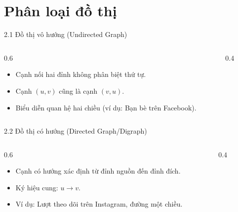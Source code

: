 \documentclass[aspectratio=169]{beamer}
\begin{document}
\section{Phân loại đồ thị}
\begin{frame}{2.1 Đồ thị vô hướng (Undirected Graph)}
    \begin{columns}
        \begin{column}{0.6\textwidth}
            \begin{itemize}
                \item Cạnh nối hai đỉnh không phân biệt thứ tự.
                \item Cạnh $(u, v)$ cũng là cạnh $(v, u)$.
                \item Biểu diễn quan hệ hai chiều (ví dụ: Bạn bè trên Facebook).
            \end{itemize}
        \end{column}
        \begin{column}{0.4\textwidth}
            \centering
        \end{column}
    \end{columns}
\end{frame}

\begin{frame}{2.2 Đồ thị có hướng (Directed Graph/Digraph)}
    \begin{columns}
        \begin{column}{0.6\textwidth}
            \begin{itemize}
                \item Cạnh có hướng xác định từ đỉnh nguồn đến đỉnh đích.
                \item Ký hiệu cung: $u \to v$.
                \item Ví dụ: Lượt theo dõi trên Instagram, đường một chiều.
            \end{itemize}
        \end{column}
        \begin{column}{0.4\textwidth}
            \centering
        \end{column}
    \end{columns}
    
\end{frame}
\end{document}
